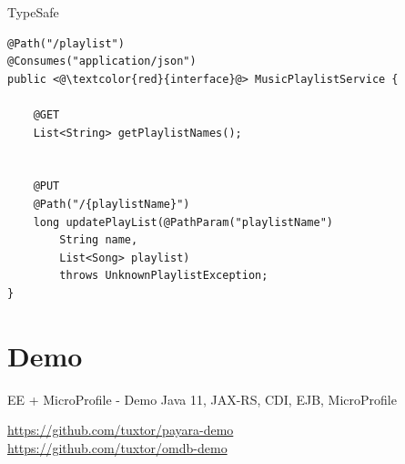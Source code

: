 \documentclass[aspectratio=169]{beamer}
\begin{document}
\begin{frame}[fragile]{TypeSafe}


\begin{lstlisting}
@Path("/playlist")
@Consumes("application/json")
public <@\textcolor{red}{interface}@> MusicPlaylistService {

    @GET
    List<String> getPlaylistNames();
    
    
    @PUT
    @Path("/{playlistName}")
    long updatePlayList(@PathParam("playlistName")
        String name,
        List<Song> playlist)
        throws UnknownPlaylistException;
}
\end{lstlisting}
\end{frame}


\section{Demo}
\begin{frame}{EE + MicroProfile  - Demo}
\huge Java 11, JAX-RS, CDI, EJB, MicroProfile

\normalsize  \url{https://github.com/tuxtor/payara-demo}\\
\normalsize  \url{https://github.com/tuxtor/omdb-demo}
\end{frame}
\end{document}
